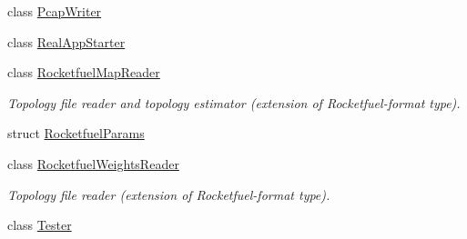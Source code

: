 \begin{DoxyCompactItemize}
class \hyperlink{classns3_1_1PcapWriter}{Pcap\+Writer}
\item 
class \hyperlink{classns3_1_1RealAppStarter}{Real\+App\+Starter}
\item 
class \hyperlink{classns3_1_1RocketfuelMapReader}{Rocketfuel\+Map\+Reader}
\begin{DoxyCompactList}\small\item\em Topology file reader and topology estimator (extension of Rocketfuel-\/format type). \end{DoxyCompactList}\item 
struct \hyperlink{structns3_1_1RocketfuelParams}{Rocketfuel\+Params}
\item 
class \hyperlink{classns3_1_1RocketfuelWeightsReader}{Rocketfuel\+Weights\+Reader}
\begin{DoxyCompactList}\small\item\em Topology file reader (extension of Rocketfuel-\/format type). \end{DoxyCompactList}\item 
class \hyperlink{classns3_1_1Tester}{Tester}
\end{DoxyCompactItemize}
